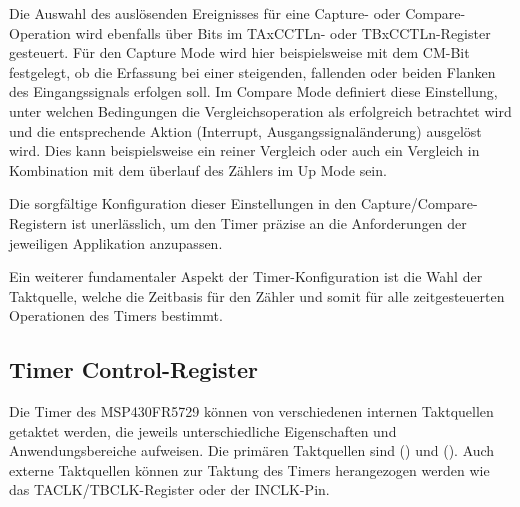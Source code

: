 Die Auswahl des ausl\"osenden Ereignisses f\"ur eine Capture- oder Compare-Operation wird ebenfalls \"uber Bits im TAxCCTLn- oder TBxCCTLn-Register gesteuert. F\"ur den Capture Mode wird hier beispielsweise mit dem CM-Bit festgelegt, ob die Erfassung bei einer steigenden, fallenden oder beiden Flanken des Eingangssignals erfolgen soll. Im Compare Mode definiert diese Einstellung, unter welchen Bedingungen die Vergleichsoperation als erfolgreich betrachtet wird und die entsprechende Aktion (Interrupt, Ausgangssignal\"anderung) ausgel\"ost wird. Dies kann beispielsweise ein reiner Vergleich oder auch ein Vergleich in Kombination mit dem \"uberlauf des Z\"ahlers im Up Mode sein. 

Die sorgf\"altige Konfiguration dieser Einstellungen in den Capture/Compare-Registern ist unerl\"asslich, um den Timer pr\"azise an die Anforderungen der jeweiligen Applikation anzupassen.

Ein weiterer fundamentaler Aspekt der Timer-Konfiguration ist \ua die Wahl der Taktquelle, welche die Zeitbasis f\"ur den Z\"ahler und somit f\"ur alle zeitgesteuerten Operationen des Timers bestimmt. \AI

\newpage
\subsection{Timer Control-Register}
\label{TimerControlRegister}

Die Timer des MSP430FR5729 k\"onnen von verschiedenen internen Taktquellen getaktet werden, die jeweils unterschiedliche Eigenschaften und Anwendungsbereiche aufweisen. Die prim\"aren Taktquellen sind  () und  (). Auch externe Taktquellen k\"onnen zur Taktung des Timers herangezogen werden wie \zB das TACLK/TBCLK-Register oder der INCLK-Pin. 

